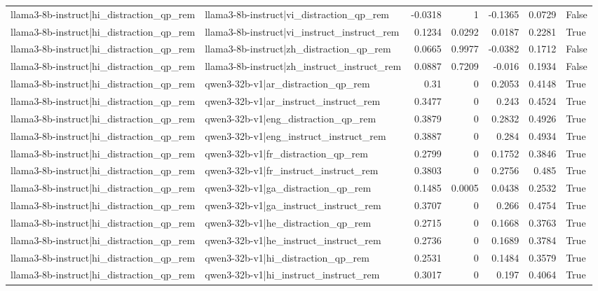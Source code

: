 \begin{table}
\begin{tabular}{l l r r r r l}
llama3-8b-instruct|hi_distraction_qp_rem & llama3-8b-instruct|vi_distraction_qp_rem & -0.0318 & 1 & -0.1365 & 0.0729 & False \\
llama3-8b-instruct|hi_distraction_qp_rem & llama3-8b-instruct|vi_instruct_instruct_rem & 0.1234 & 0.0292 & 0.0187 & 0.2281 & True \\
llama3-8b-instruct|hi_distraction_qp_rem & llama3-8b-instruct|zh_distraction_qp_rem & 0.0665 & 0.9977 & -0.0382 & 0.1712 & False \\
llama3-8b-instruct|hi_distraction_qp_rem & llama3-8b-instruct|zh_instruct_instruct_rem & 0.0887 & 0.7209 & -0.016 & 0.1934 & False \\
llama3-8b-instruct|hi_distraction_qp_rem & qwen3-32b-v1|ar_distraction_qp_rem & 0.31 & 0 & 0.2053 & 0.4148 & True \\
llama3-8b-instruct|hi_distraction_qp_rem & qwen3-32b-v1|ar_instruct_instruct_rem & 0.3477 & 0 & 0.243 & 0.4524 & True \\
llama3-8b-instruct|hi_distraction_qp_rem & qwen3-32b-v1|eng_distraction_qp_rem & 0.3879 & 0 & 0.2832 & 0.4926 & True \\
llama3-8b-instruct|hi_distraction_qp_rem & qwen3-32b-v1|eng_instruct_instruct_rem & 0.3887 & 0 & 0.284 & 0.4934 & True \\
llama3-8b-instruct|hi_distraction_qp_rem & qwen3-32b-v1|fr_distraction_qp_rem & 0.2799 & 0 & 0.1752 & 0.3846 & True \\
llama3-8b-instruct|hi_distraction_qp_rem & qwen3-32b-v1|fr_instruct_instruct_rem & 0.3803 & 0 & 0.2756 & 0.485 & True \\
llama3-8b-instruct|hi_distraction_qp_rem & qwen3-32b-v1|ga_distraction_qp_rem & 0.1485 & 0.0005 & 0.0438 & 0.2532 & True \\
llama3-8b-instruct|hi_distraction_qp_rem & qwen3-32b-v1|ga_instruct_instruct_rem & 0.3707 & 0 & 0.266 & 0.4754 & True \\
llama3-8b-instruct|hi_distraction_qp_rem & qwen3-32b-v1|he_distraction_qp_rem & 0.2715 & 0 & 0.1668 & 0.3763 & True \\
llama3-8b-instruct|hi_distraction_qp_rem & qwen3-32b-v1|he_instruct_instruct_rem & 0.2736 & 0 & 0.1689 & 0.3784 & True \\
llama3-8b-instruct|hi_distraction_qp_rem & qwen3-32b-v1|hi_distraction_qp_rem & 0.2531 & 0 & 0.1484 & 0.3579 & True \\
llama3-8b-instruct|hi_distraction_qp_rem & qwen3-32b-v1|hi_instruct_instruct_rem & 0.3017 & 0 & 0.197 & 0.4064 & True \\

\end{tabular}
\end{table}
